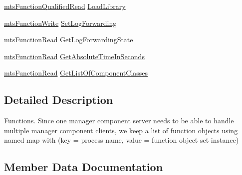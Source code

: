 \begin{DoxyCompactItemize}
\hyperlink{classmts_function_qualified_read}{mts\+Function\+Qualified\+Read} \hyperlink{structmts_manager_component_server_1_1_interface_g_c_m_function_type_aa315e1ac5f0bfae4aca4435eea5ca8ff}{Load\+Library}
\item 
\hyperlink{classmts_function_write}{mts\+Function\+Write} \hyperlink{structmts_manager_component_server_1_1_interface_g_c_m_function_type_a77180d227fd77e4ad2de4862b82713d4}{Set\+Log\+Forwarding}
\item 
\hyperlink{classmts_function_read}{mts\+Function\+Read} \hyperlink{structmts_manager_component_server_1_1_interface_g_c_m_function_type_a7323a2480138e7cb183178bd7da16862}{Get\+Log\+Forwarding\+State}
\item 
\hyperlink{classmts_function_read}{mts\+Function\+Read} \hyperlink{structmts_manager_component_server_1_1_interface_g_c_m_function_type_a59b6a8abd6bbee0edcc9470a447d66ef}{Get\+Absolute\+Time\+In\+Seconds}
\item 
\hyperlink{classmts_function_read}{mts\+Function\+Read} \hyperlink{structmts_manager_component_server_1_1_interface_g_c_m_function_type_a1002b4425d7edf9645e7e2f4b7f43098}{Get\+List\+Of\+Component\+Classes}
\end{DoxyCompactItemize}


\subsection{Detailed Description}
Functions. Since one manager component server needs to be able to handle multiple manager component clients, we keep a list of function objects using named map with (key = process name, value = function object set instance) 

\subsection{Member Data Documentation}
\hypertarget{structmts_manager_component_server_1_1_interface_g_c_m_function_type_a85219d262bbbed632ce7162b09a4d395}{}
